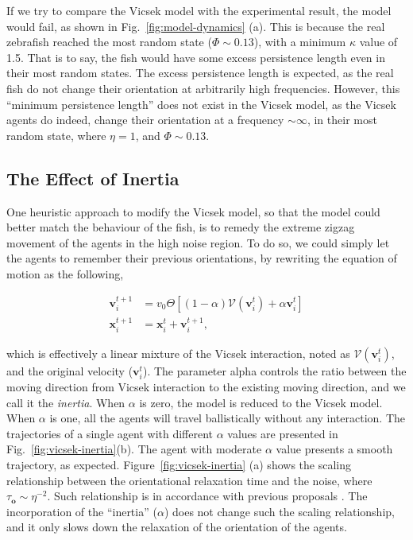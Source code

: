 \documentclass[11pt,twoside]{report}
\begin{document}
 

If we try to compare the Vicsek model with the experimental result, the model would fail, as shown in Fig.~\ref{fig:model-dynamics} (a). 
This is because the real zebrafish reached the most random state ($\Phi \sim 0.13$), with a minimum $\kappa$ value of 1.5. That is to say, the fish would have some excess persistence length even in their most random states.
The excess persistence length is expected, as the real fish do not change their orientation at arbitrarily high frequencies. However, this ``minimum persistence length'' does not exist in the Vicsek model, as the Vicsek agents do indeed, change their orientation at a frequency $\sim \infty$, in their most random state, where $\eta = 1$, and $\Phi \sim 0.13$.


\subsection{The Effect of Inertia}
\label{section:model-vicsek-inertia}

One heuristic approach to modify the Vicsek model, so that the model could better match the behaviour of the fish, is to remedy the extreme zigzag movement of the agents in the high noise region. To do so, we could simply let the agents to remember their previous orientations, by rewriting the equation of motion as the following,

\begin{equation}
\begin{split}
	\mathbf{v}_{i}^{t+1}
	&= v_0 \Theta \left[
		(1 - \alpha) \mathcal{V}(\mathbf{v}_i^t) +
		\alpha \mathbf{v}_i^t
	\right]
    \\
	\mathbf{x}_i^{t+1}
	&= \mathbf{x}_i^{t} + \mathbf{v}_i^{t+1},
\end{split}
\label{eq:vicsek-inertia}
\end{equation}

\noindent which is effectively a linear mixture of the Vicsek interaction, noted as $\mathcal{V}(\mathbf{v}_i^t)$, and the original velocity ($\mathbf{v}_i^t$).
The parameter \gls{alpha} controls the ratio between the moving direction from Vicsek interaction to the existing moving direction, and we call it the \emph{inertia}.
When $\alpha$ is zero, the model is reduced to the Vicsek model.
When $\alpha$ is one, all the agents will travel ballistically without any interaction. The trajectories of a single agent with different $\alpha$ values are presented in Fig.~\ref{fig:vicsek-inertia}(b). The agent with moderate $\alpha$ value presents a smooth trajectory, as expected.
Figure~\ref{fig:vicsek-inertia} (a) shows the scaling relationship between the orientational relaxation time and the noise, where $\tau_\mathbf{o} \sim \eta^{-2}$. Such relationship is in accordance with previous proposals \cite{ginelli2016, puzzo2019}. The incorporation of the ``inertia'' ($\alpha$) does not change such the scaling relationship, and it only slows down the relaxation of the orientation of the agents.
\end{document}
